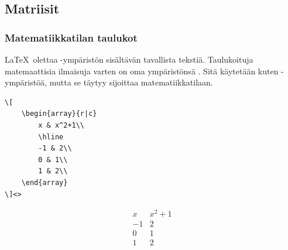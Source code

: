 %
%

\begin{frame}[fragile]
    
\end{frame}


\subsection{Matriisit}

\begin{frame}[fragile]
    \frametitle{Matematiikkatilan taulukot}
    \LaTeX\ olettaa -ympäristön sisältävän tavallista tekstiä. Taulukoituja matemaattisia ilmaisuja varten on oma ympäristönsä . Sitä käytetään kuten -ympäristöä, mutta se täytyy sijoittaa matematiikkatilaan.\vaihto

    \begin{minipage}{5cm}
        \begin{lstlisting}
\[
    \begin{array}{r|c}
        x & x^2+1\\
        \hline
        -1 & 2\\
        0 & 1\\
        1 & 2\\
    \end{array}
\]<>
        \end{lstlisting}
    \end{minipage}
    \begin{minipage}{5cm}
        \[
        \begin{array}{r|c}
            x & x^2+1\\
            \hline
            -1 & 2\\
            0 & 1\\
            1 & 2\\
        \end{array}
        \]
    \end{minipage}
\end{frame}

